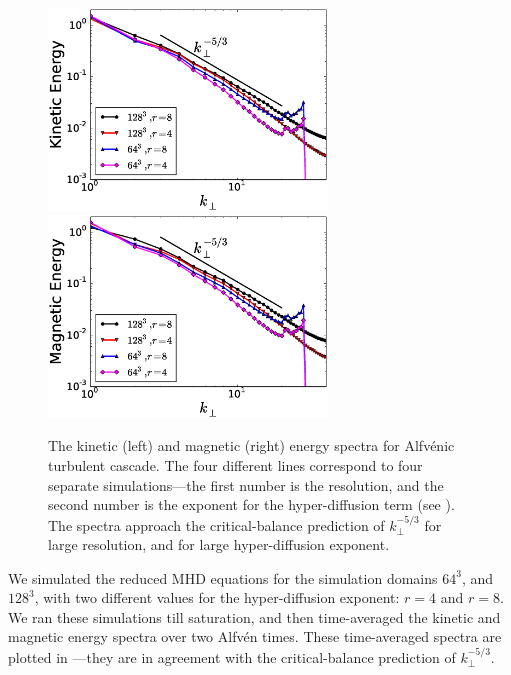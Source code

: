     \begin{figure}
    \begin{center}
        \includegraphics[width=7.4cm]{figs/gandalf/alfconv_KE.eps}
        \includegraphics[width=7.4cm]{figs/gandalf/alfconv_ME.eps}
        \caption{The kinetic (left) and magnetic (right) energy spectra for Alfv\'{e}nic
        turbulent cascade. The four different lines correspond to four separate
        simulations---the first number is the resolution, and the second number is
        the exponent for the hyper-diffusion term (see ). The
        spectra approach the critical-balance prediction of $k_\perp^{-5/3}$ for large
        resolution, and for large hyper-diffusion exponent.}
        \label{gandalf:fig:alfconv}
    \end{center}
    \end{figure}

    We simulated the reduced MHD equations for the simulation domains $64^3$, and $128^3$,
    with two different values for the hyper-diffusion exponent: $r=4$ and $r=8$. We ran
    these simulations till saturation, and then time-averaged the kinetic and magnetic
    energy spectra over two Alfv\'{e}n times. These time-averaged spectra are plotted in
    ---they are in agreement with the critical-balance prediction of
    $k_\perp^{-5/3}$.


